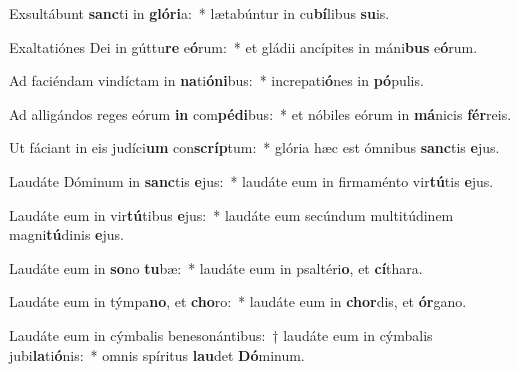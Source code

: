 \item Exsultábunt \textbf{sanc}ti in \textbf{gló}\textbf{ri}a:~* lætabúntur in cu\textbf{bí}libus \textbf{su}is.
\item Exaltatiónes Dei in gúttu\textbf{re} e\textbf{ó}rum:~* et gládii ancípites in máni\textbf{bus} e\textbf{ó}rum.
\item Ad faciéndam vindíctam in \textbf{na}ti\textbf{ó}\textbf{ni}bus:~* increpati\textbf{ó}nes in \textbf{pó}pulis.
\item Ad alligándos reges eórum \textbf{in} com\textbf{pé}\textbf{di}bus:~* et nóbiles eórum in \textbf{má}nicis \textbf{fér}reis.
\item Ut fáciant in eis judíci\textbf{um} con\textbf{scríp}tum:~* glória hæc est ómnibus \textbf{sanc}tis \textbf{e}jus.
\item Laudáte Dóminum in \textbf{sanc}tis \textbf{e}jus:~* laudáte eum in firmaménto vir\textbf{tú}tis \textbf{e}jus.
\item Laudáte eum in vir\textbf{tú}tibus \textbf{e}jus:~* laudáte eum secúndum multitúdinem magni\textbf{tú}dinis \textbf{e}jus.
\item Laudáte eum in \textbf{so}no \textbf{tu}bæ:~* laudáte eum in psaltéri\textbf{o}, et \textbf{cí}thara.
\item Laudáte eum in týmpa\textbf{no}, et \textbf{cho}ro:~* laudáte eum in \textbf{chor}dis, et \textbf{ór}gano.
\item Laudáte eum in cýmbalis benesonántibus:~† laudáte eum in cýmbalis jubi\textbf{la}ti\textbf{ó}nis:~* omnis spíritus \textbf{lau}det \textbf{Dó}minum.
